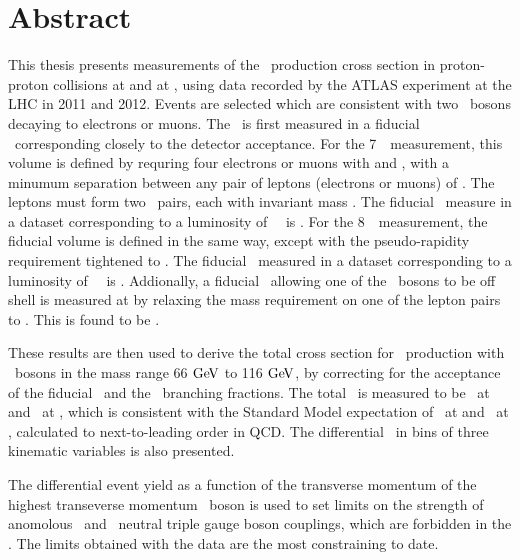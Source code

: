 \chapter*{Abstract}
This thesis presents measurements of the \ZZ\ production cross section in
proton-proton collisions at  and at , using data recorded
by the ATLAS experiment at the LHC in 2011 and 2012.  Events are selected which
are consistent with two \Z\ bosons decaying to electrons or muons. The \cx\ is
first measured in a fiducial \phasespace\ corresponding closely to the detector
acceptance. For the 7~\tev\ measurement, this volume is defined by requring four
electrons or muons with  and , with a minumum separation
between any pair of leptons (electrons or muons) of . The leptons
must form two \ossf\ pairs, each with invariant mass \sstooos. The fiducial \cx\
measure in a dataset corresponding to a luminosity of
\LumiPassGRLTwentyEleven~\ifb\ is \ZZSevenTeVFiducialCrossSectionZZLLLL. For the
8~\tev\ measurement, the fiducial volume is defined in the same way, except with
the pseudo-rapidity requirement tightened to \modetalt{2.7}. The fiducial \cx\
measured in a dataset corresponding to a luminosity of
\LumiPassGRLTwentyTwelve~\ifb\ is \ZZEightTeVFiducialCrossSectionZZLLLL.
Addionally, a fiducial \cx\ allowing one of the \Z\ bosons to be off shell is
measured at \sqrtseq{7} by relaxing the mass requirement on one of the lepton pairs
to \mllgtt. This is found to be \ZZSevenTeVFiducialCrossSectionZZsLLLL.

These results are then used to derive the total cross section for \ZZ\
production with \Z\ bosons in the mass range 66$\GeV$ to 116$\GeV$, by
correcting for the acceptance of the fiducial \phasespace\ and the \Zll\
branching fractions. The total \cx\ is measured to be
\ZZSevenTeVTotalCrossSection\ at \sqrtseq{7} and \ZZEightTeVTotalCrossSection\
at , which is consistent with the Standard Model expectation of
\ZZSevenTeVTheoryTotalCrossSection\ at \sqrtseq{7} and
\ZZEightTeVTheoryTotalCrossSection\ at \sqrtseq{8}, calculated to
next-to-leading order in QCD.  The differential \cx\ in bins of three kinematic
variables is also presented.

The differential event yield as a function of the transverse momentum of the
highest transeverse momentum \Z\ boson is used to set limits on the strength of
anomolous \ZZZ\ and \ZZg\ neutral triple gauge boson couplings, which are
forbidden in the \sm. 
The limits obtained with the \sqrtseq{8} data are the most constraining to date.

